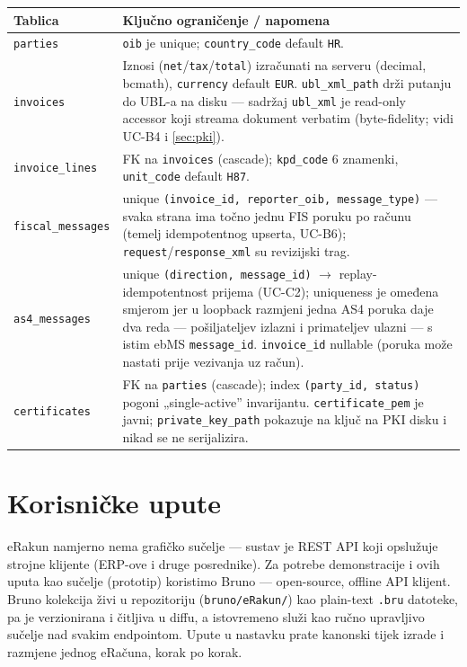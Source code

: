 \documentclass[11pt,a4paper]{article}
\begin{document}
\begin{tabularx}{\textwidth}{@{}lY@{}}
\toprule
\textbf{Tablica} & \textbf{Ključno ograničenje / napomena} \\
\midrule
\texttt{parties} & \texttt{oib} je unique; \texttt{country\_code} default \texttt{HR}. \\
\texttt{invoices} & Iznosi (\texttt{net}/\texttt{tax}/\texttt{total}) izračunati na serveru (decimal, bcmath), \texttt{currency} default \texttt{EUR}. \texttt{ubl\_xml\_path} drži putanju do UBL-a na disku — sadržaj \texttt{ubl\_xml} je read-only accessor koji streama dokument verbatim (byte-fidelity; vidi UC-B4 i \ref{sec:pki}). \\
\texttt{invoice\_lines} & FK na \texttt{invoices} (cascade); \texttt{kpd\_code} 6 znamenki, \texttt{unit\_code} default \texttt{H87}. \\
\texttt{fiscal\_messages} & unique \texttt{(invoice\_id, reporter\_oib, message\_type)} — svaka strana ima točno jednu FIS poruku po računu (temelj idempotentnog upserta, UC-B6); \texttt{request}/\texttt{response\_xml} su revizijski trag. \\
\texttt{as4\_messages} & unique \texttt{(direction, message\_id)} $\rightarrow$ replay-idempotentnost prijema (UC-C2); uniqueness je omeđena smjerom jer u loopback razmjeni jedna AS4 poruka daje dva reda — pošiljateljev izlazni i primateljev ulazni — s istim ebMS \texttt{message\_id}. \texttt{invoice\_id} nullable (poruka može nastati prije vezivanja uz račun). \\
\texttt{certificates} & FK na \texttt{parties} (cascade); index \texttt{(party\_id, status)} pogoni „single-active” invarijantu. \texttt{certificate\_pem} je javni; \texttt{private\_key\_path} pokazuje na ključ na PKI disku i nikad se ne serijalizira. \\
\bottomrule
\end{tabularx}

\section{Korisničke upute}

eRakun namjerno nema grafičko sučelje — sustav je REST API koji opslužuje
strojne klijente (ERP-ove i druge posrednike). Za potrebe demonstracije i ovih uputa
kao sučelje (prototip) koristimo Bruno — open-source, offline API
klijent. Bruno kolekcija živi u repozitoriju (\texttt{bruno/eRakun/}) kao plain-text
\texttt{.bru} datoteke, pa je verzionirana i čitljiva u diffu, a istovremeno služi kao
ručno upravljivo sučelje nad svakim endpointom. Upute u nastavku prate kanonski
tijek izrade i razmjene jednog eRačuna, korak po korak.
\end{document}
